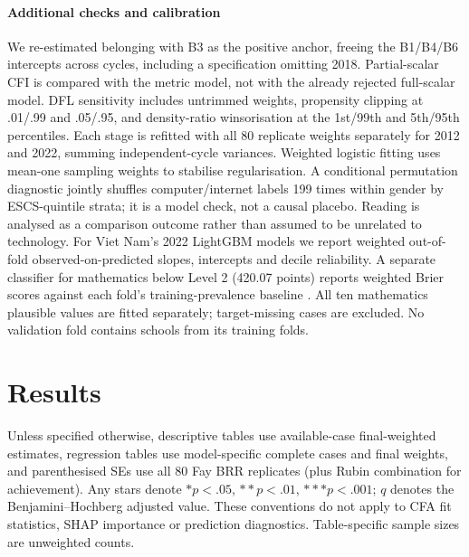 \documentclass[preprint,12pt,authoryear,nonatbib]{elsarticle}
\let\citep\parencite
\begin{document}
\paragraph{Additional checks and calibration} We re-estimated belonging with B3 as the positive anchor, freeing the B1/B4/B6 intercepts across cycles, including a specification omitting 2018. Partial-scalar CFI is compared with the metric model, not with the already rejected full-scalar model. DFL sensitivity includes untrimmed weights, propensity clipping at .01/.99 and .05/.95, and density-ratio winsorisation at the 1st/99th and 5th/95th percentiles. Each stage is refitted with all 80 replicate weights separately for 2012 and 2022, summing independent-cycle variances. Weighted logistic fitting uses mean-one sampling weights to stabilise regularisation. A conditional permutation diagnostic jointly shuffles computer/internet labels 199 times within gender by ESCS-quintile strata; it is a model check, not a causal placebo. Reading is analysed as a comparison outcome rather than assumed to be unrelated to technology. For Viet Nam's 2022 LightGBM models we report weighted out-of-fold observed-on-predicted slopes, intercepts and decile reliability. A separate classifier for mathematics below Level 2 (420.07 points) reports weighted Brier scores against each fold's training-prevalence baseline \citep{oecd2023vol1}. All ten mathematics plausible values are fitted separately; target-missing cases are excluded. No validation fold contains schools from its training folds.


\section{Results}
Unless specified otherwise, descriptive tables use available-case final-weighted estimates, regression tables use model-specific complete cases and final weights, and parenthesised SEs use all 80 Fay BRR replicates (plus Rubin combination for achievement). Any stars denote $*p<.05$, $**p<.01$, $***p<.001$; $q$ denotes the Benjamini--Hochberg adjusted value. These conventions do not apply to CFA fit statistics, SHAP importance or prediction diagnostics. Table-specific sample sizes are unweighted counts.
\end{document}

